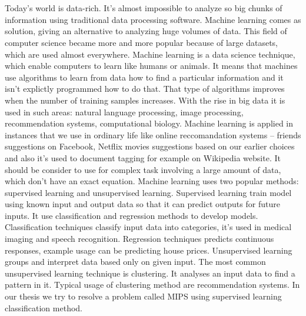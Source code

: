 \section{}

Today’s world is data-rich. It’s almost impossible to analyze so big chunks of information using traditional data processing software.
Machine learning comes as solution, giving an alternative to analyzing huge volumes of data. 
This field of computer science became more and more popular because of large datasets, which are used almost everywhere. 
Machine learning is a data science technique, which enable computers to learn like humans or animals. It means that machines use algorithms to learn from data how to find a particular information and it isn’t explictly programmed how to do that. 
That type of algorithms improves when the number of training samples increases. 
With the rise in big data it is used in such areas: natural language processing, image processing, recommendation systems, computational biology. Machine learning is applied in instances that we use in ordinary life like online reccomandation systems – friends suggestions on Facebook, Netflix movies suggestions based on our earlier choices and also it’s used to document tagging for example on Wikipedia website. 
It should be consider to use for complex task involving a large amount of data, which don’t have an exact equation. 
Machine learning uses two popular methods: supervised learning and unsupervised learning. 
Supervised learning train model using known input and output data so that it can predict outputs for future inputs.
It use classification and regression methods to develop models. 
Classification techniques classify input data into categories, it’s used in medical imaging and speech recognition. 
Regression techniques predicts continuous responses, example usage can be predicting house prices. Unsupervised learning groups and interpret data based only on given input. 
The most common unsupervised learning technique is clustering. 
It analyses an input data to find a pattern in it. Typical usage of clustering method are recommendation systems. In our thesis we try to resolve a problem called MIPS using supervised learning classification method.
